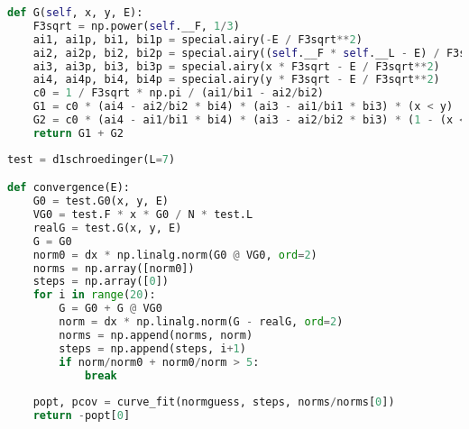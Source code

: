 \begin{lstlisting}[language=Python]
def G(self, x, y, E):
    F3sqrt = np.power(self.__F, 1/3)
    ai1, ai1p, bi1, bi1p = special.airy(-E / F3sqrt**2)
    ai2, ai2p, bi2, bi2p = special.airy((self.__F * self.__L - E) / F3sqrt**2)
    ai3, ai3p, bi3, bi3p = special.airy(x * F3sqrt - E / F3sqrt**2)
    ai4, ai4p, bi4, bi4p = special.airy(y * F3sqrt - E / F3sqrt**2)
    c0 = 1 / F3sqrt * np.pi / (ai1/bi1 - ai2/bi2)
    G1 = c0 * (ai4 - ai2/bi2 * bi4) * (ai3 - ai1/bi1 * bi3) * (x < y)
    G2 = c0 * (ai4 - ai1/bi1 * bi4) * (ai3 - ai2/bi2 * bi3) * (1 - (x < y))
    return G1 + G2
\end{lstlisting}

\begin{lstlisting}[language=Python]
test = d1schroedinger(L=7)

def convergence(E):
    G0 = test.G0(x, y, E)
    VG0 = test.F * x * G0 / N * test.L
    realG = test.G(x, y, E)
    G = G0
    norm0 = dx * np.linalg.norm(G0 @ VG0, ord=2)
    norms = np.array([norm0])
    steps = np.array([0])
    for i in range(20):
        G = G0 + G @ VG0
        norm = dx * np.linalg.norm(G - realG, ord=2)
        norms = np.append(norms, norm)
        steps = np.append(steps, i+1)
        if norm/norm0 + norm0/norm > 5:
            break
    
    popt, pcov = curve_fit(normguess, steps, norms/norms[0])
    return -popt[0]
\end{lstlisting}